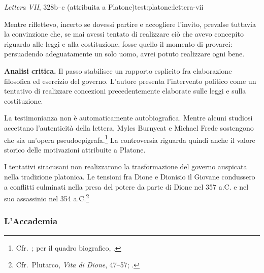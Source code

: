 \begin{testimonianza}{\emph{Lettera VII}, 328b--c (attribuita a Platone)}{test:platone:lettera-vii}
\smallskip
{}\par
Mentre riflettevo, incerto se dovessi partire e accogliere l'invito, prevalse tuttavia la convinzione che, se mai avessi tentato di realizzare ciò che avevo concepito riguardo alle leggi e alla costituzione, fosse quello il momento di provarci: persuadendo adeguatamente un solo uomo, avrei potuto realizzare ogni bene.
\end{testimonianza}


\noindent\textbf{Analisi critica.}
Il passo stabilisce un rapporto esplicito fra elaborazione filosofica ed esercizio del governo. L'autore presenta l'intervento politico come un tentativo di realizzare concezioni precedentemente elaborate sulle leggi e sulla costituzione.

La testimonianza non è automaticamente autobiografica. Mentre alcuni studiosi accettano l'autenticità della lettera, Myles Burnyeat e Michael Frede sostengono che sia un'opera pseudoepigrafa.\footnote{Cfr.\ \cite{burnyeatfrede2015}; per il quadro biografico, \cite{waterfield2023}.} La controversia riguarda quindi anche il valore storico delle motivazioni attribuite a Platone.

I tentativi siracusani non realizzarono la trasformazione del governo auspicata nella tradizione platonica. Le tensioni fra Dione e Dionisio il Giovane condussero a conflitti culminati nella presa del potere da parte di Dione nel 357 a.C. e nel suo assassinio nel 354 a.C.\footnote{Cfr.\ Plutarco, \emph{Vita di Dione}, 47--57; \cite[95]{palumbo2015}.}

\subsubsection{L'Accademia}

